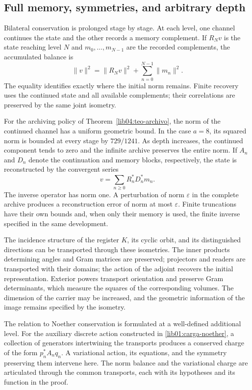 \subsection*{Full memory, symmetries, and arbitrary depth}
\label{libnar:memoria}

Bilateral conservation is prolonged stage by stage. At each level,
one channel continues the state and the other records a memory
complement. If \(R_Nv\) is the state reaching level \(N\) and
\(m_0,\ldots,m_{N-1}\) are the recorded complements, the
accumulated balance is
\[
 \|v\|^2=\|R_Nv\|^2+\sum_{n=0}^{N-1}\|m_n\|^2.
\]
The equality identifies exactly where the initial norm
remains. Finite recovery uses the continued state and
all available complements; their correlations are preserved
by the same joint isometry.

For the archiving policy of Theorem~\ref{lib04:teo-archivo}, the
norm of the continued channel has a uniform geometric bound.
In the case \(a=8\), its squared norm is bounded at every stage
by \(729/1241\). As depth increases, the continued
component tends to zero and the infinite archive preserves the entire
norm. If \(A_n\) and \(D_n\) denote the continuation
and memory blocks, respectively, the state is reconstructed
by the convergent series
\[
 v=\sum_{n\geq0}R_n^*D_n^*m_n.
\]
The inverse operator has norm one. A perturbation of norm
\(\varepsilon\) in the complete archive produces a reconstruction
error of norm at most \(\varepsilon\). Finite
truncations have their own bounds and, when only
their memory is used, the finite inverse specified in the same
development.

\pagebreak %
The incidence structure of the register \(K\), its cyclic orbit, and its
distinguished directions can be transported through these
isometries. The inner products determining angles
and Gram matrices are preserved; projectors and readers are
transported with their domains; the action of the adjoint recovers the
initial representation. Exterior powers transport
orientation and preserve Gram determinants, which measure the
squares of the corresponding volumes. The dimension of the
carrier may be increased, and the geometric information of the
image remains specified by the isometry.

The relation to Noether conservation is formulated at a
well-defined additional level. For the auxiliary discrete action
constructed in \cref{lib01:carga-noether}, a collection of
generators intertwining the transports produces a
conserved charge of the form \(p_n^*A_nq_n\). A variational
action, its equations, and the symmetry preserving them intervene here.
The norm balance and the variational charge are articulated through
the common transports, each with its hypotheses and its
function in the proof.

